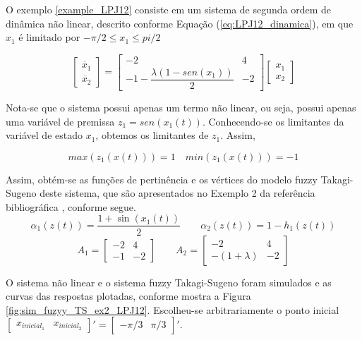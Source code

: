 \begin{example}\end{example}\label{ex:LPJ12_fuzzyTS}
O exemplo \ref{example_LPJ12} consiste em um sistema de segunda ordem de dinâmica não linear, descrito conforme Equação (\ref{eq:LPJ12_dinamica}), em que $x_1$ é limitado por $-\pi/2 \leq x_1 \leq pi/2$

\begin{equation}\label{eq:LPJ12_dinamica}
\begin{bmatrix}\dot{x_1}\\ \dot{x_2} \end{bmatrix} = \begin{bmatrix} -2 & 4\\  -1 - \dfrac{\lambda (1 - sen(x_1))}{2} & -2 \end{bmatrix} \begin{bmatrix}x_1 \\ x_2 \end{bmatrix}
\end{equation}

Nota-se que o sistema possui apenas um termo não linear, ou seja, possui apenas uma variável de premissa $z_1 = sen(x_1(t))$. Conhecendo-se os limitantes da variável de estado $x_1$, obtemos os limitantes de $z_1$. Assim,

\begin{equation*}max(z_1(x(t))) = 1\quad min(z_1(x(t))) = -1\end{equation*}

Assim, obtém-se as funções de pertinência e os vértices do modelo fuzzy Takagi-Sugeno deste sistema, que são apresentados no Exemplo 2 da referência bibliográfica \cite{article:LPJ:2011}, conforme segue.
\begin{equation*}
\alpha_1(z(t)) = \dfrac{1+\sin(x_1(t))}{2}\qquad \alpha_2(z(t)) = 1 - h_1(z(t))
\end{equation*}
\begin{equation*}
A_1 = \begin{bmatrix}-2&4\\-1&-2\end{bmatrix}\qquad A_2 = \begin{bmatrix}-2&4\\-(1+\lambda)&-2\end{bmatrix}
\end{equation*}

O sistema não linear e o sistema fuzzy Takagi-Sugeno foram simulados e as curvas das respostas plotadas, conforme mostra a Figura \ref{fig:sim_fuzyy_TS_ex2_LPJ12}. Escolheu-se arbitrariamente o ponto inicial $\begin{bmatrix}x_{{inicial}_1}&x_{{inicial}_2}\end{bmatrix}' = \begin{bmatrix}-\pi/3&\pi/3\end{bmatrix}'$.

